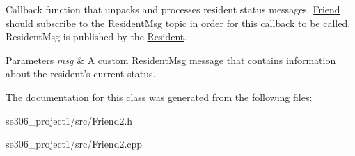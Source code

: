 Callback function that unpacks and processes resident status messages. \hyperlink{classFriend}{Friend} should subscribe to the Resident\-Msg topic in order for this callback to be called. Resident\-Msg is published by the \hyperlink{classResident}{Resident}. 


\begin{DoxyParams}{Parameters}
{\em msg} & A custom Resident\-Msg message that contains information about the resident's current status. \\
\hline
\end{DoxyParams}


The documentation for this class was generated from the following files\-:\begin{DoxyCompactItemize}
\item 
se306\-\_\-project1/src/Friend2.\-h\item 
se306\-\_\-project1/src/Friend2.\-cpp\end{DoxyCompactItemize}
